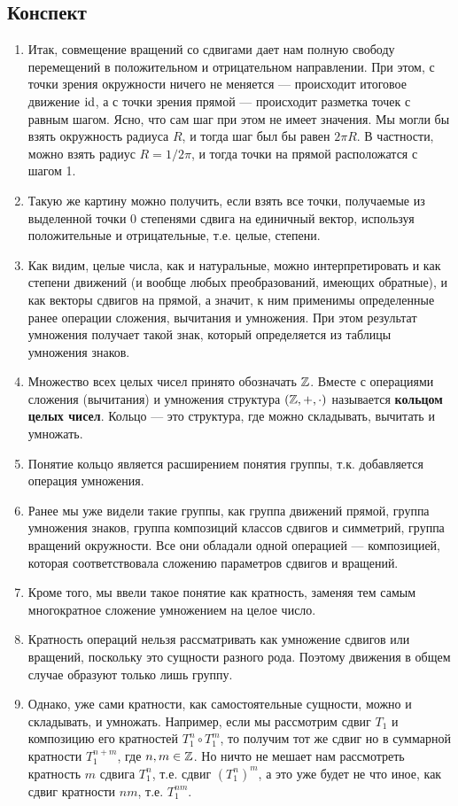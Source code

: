 \subsection{Конспект}
\begin{enumerate}\setlength{\itemsep}{1pt}
\item Итак, совмещение вращений со сдвигами дает нам полную свободу перемещений в положительном и отрицательном направлении. При этом, с точки зрения окружности ничего не меняется --- происходит итоговое движение $\mathrm{id}$, а с точки зрения прямой --- происходит разметка точек с равным шагом. Ясно, что сам шаг при этом не имеет значения. Мы могли бы взять окружность радиуса $R$, и тогда шаг был бы равен $2\pi R$. В частности, можно взять радиус $R=1/2\pi$, и тогда точки на прямой расположатся с шагом 1.
\item Такую же картину можно получить, если взять все точки, получаемые из выделенной точки 0 степенями сдвига на единичный вектор, используя положительные и отрицательные, т.е. целые, степени.
\item Как видим, целые числа, как и натуральные, можно интерпретировать и как степени движений (и вообще любых преобразований, имеющих обратные), и как векторы сдвигов на прямой, а значит, к ним применимы определенные ранее операции сложения, вычитания и умножения. При этом результат умножения получает такой знак, который определяется из таблицы умножения знаков.
\item Множество всех целых чисел принято обозначать $\mathbb Z$. Вместе с операциями сложения (вычитания) и умножения структура $(\mathbb Z,+,\cdot)$ называется \textbf{кольцом целых чисел}. Кольцо --- это структура, где можно складывать, вычитать и умножать.
\item Понятие кольцо является расширением понятия группы, т.к. добавляется операция умножения.
\item Ранее мы уже видели такие группы, как группа движений прямой, группа умножения знаков, группа композиций классов сдвигов и симметрий, группа вращений окружности. Все они обладали одной операцией --- композицией, которая соответствовала сложению параметров сдвигов и вращений.
\item Кроме того, мы ввели такое понятие как кратность, заменяя тем самым многократное сложение умножением на целое число.
\item Кратность операций нельзя рассматривать как умножение сдвигов или вращений, поскольку это сущности разного рода. Поэтому движения в общем случае образуют только лишь группу.
\item Однако, уже сами кратности, как самостоятельные сущности, можно и складывать, и умножать. Например, если мы рассмотрим сдвиг $T_1$ и композицию его кратностей $T_1^n\circ T_1^m$, то получим тот же сдвиг но в суммарной кратности $T_1^{n+m}$, где $n,m\in\mathbb Z$. Но ничто не мешает нам рассмотреть кратность $m$ сдвига $T_1^n$, т.е. сдвиг $(T_1^n)^m$, а это уже будет не что иное, как сдвиг кратности $nm$, т.е. $T_1^{nm}$.

\end{enumerate}
